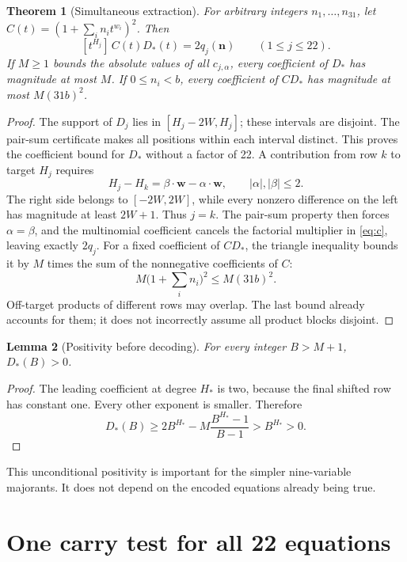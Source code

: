 \documentclass[11pt]{article}
\newtheorem{theorem}{Theorem}[section]
\newtheorem{lemma}[theorem]{Lemma}
\begin{document}
\begin{theorem}[Simultaneous extraction]\label{thm:extract}
For arbitrary integers $n_1,\ldots,n_{31}$, let
$C(t)=(1+\sum_i n_i t^{w_i})^2$. Then
\[
 [t^{H_j}]\,C(t)D_*(t)=2q_j(\mathbf n)\qquad(1\le j\le22).
\]
If $M\ge1$ bounds the absolute values of all $c_{j,\alpha}$, every
coefficient of $D_*$ has magnitude at most $M$. If $0\le n_i<b$, every
coefficient of $CD_*$ has magnitude at most $M(31b)^2$.
\end{theorem}
\begin{proof}
The support of $D_j$ lies in $[H_j-2W,H_j]$; these intervals are disjoint.
The pair-sum certificate makes all positions within each interval distinct.
This proves the coefficient bound for $D_*$ without a factor of 22.
A contribution from row $k$ to target $H_j$ requires
\[
 H_j-H_k=\beta\cdot\mathbf w-\alpha\cdot\mathbf w,
 \qquad |\alpha|,|\beta|\le2.
\]
The right side belongs to $[-2W,2W]$, while every nonzero difference on the
left has magnitude at least $2W+1$. Thus $j=k$. The pair-sum property then
forces $\alpha=\beta$, and the multinomial coefficient cancels the factorial
multiplier in \eqref{eq:c}, leaving exactly $2q_j$.
For a fixed coefficient of $CD_*$, the triangle inequality bounds it by
$M$ times the sum of the nonnegative coefficients of $C$:
\[
 M\bigl(1+\textstyle\sum_i n_i\bigr)^2\le M(31b)^2.
\]
Off-target products of different rows may overlap. The last bound already
accounts for them; it does not incorrectly assume all product blocks disjoint.
\end{proof}

\begin{lemma}[Positivity before decoding]\label{lem:Dpositive}
For every integer $B>M+1$, $D_*(B)>0$.
\end{lemma}
\begin{proof}
The leading coefficient at degree $H_*$ is two, because the final shifted
row has constant one. Every other exponent is smaller. Therefore
\[
 D_*(B)\ge2B^{H_*}-M\frac{B^{H_*}-1}{B-1}>B^{H_*}>0.
\]
\end{proof}
This unconditional positivity is important for the simpler nine-variable
majorants. It does not depend on the encoded equations already being true.

\section{One carry test for all 22 equations}\label{sec:carry}
\end{document}
